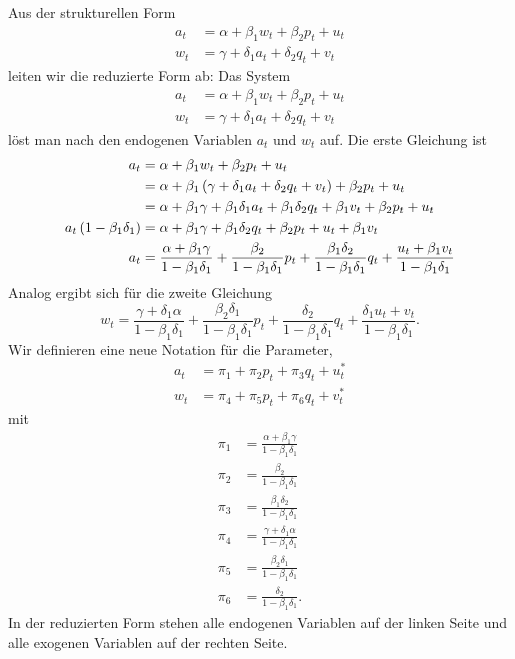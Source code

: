 \documentclass{article}
\begin{document}
Aus der strukturellen Form
\begin{align*}
a_{t} &=\alpha +\beta _{1}w_{t}+\beta _{2}p_{t}+u_{t} \\
w_{t} &=\gamma +\delta _{1}a_{t}+\delta _{2}q_{t}+v_{t}
\end{align*}
leiten wir die reduzierte Form ab: Das System
\begin{align*}
a_{t} &=\alpha +\beta _{1}w_{t}+\beta _{2}p_{t}+u_{t} \\
w_{t} &=\gamma +\delta _{1}a_{t}+\delta _{2}q_{t}+v_{t}
\end{align*}
löst man nach den endogenen Variablen $a_{t}$ und $w_{t}$ auf.
Die erste Gleichung ist
\begin{align*}
a_{t} &=\alpha +\beta _{1}w_{t}+\beta _{2}p_{t}+u_{t} \\
&=\alpha +\beta _{1}\left( \gamma +\delta _{1}a_{t}+\delta
_{2}q_{t}+v_{t}\right) +\beta _{2}p_{t}+u_{t} \\
&=\alpha +\beta _{1}\gamma +\beta _{1}\delta _{1}a_{t}+\beta _{1}\delta
_{2}q_{t}+\beta _{1}v_{t}+\beta _{2}p_{t}+u_{t} \\
a_{t}\left( 1-\beta _{1}\delta _{1}\right) &=\alpha +\beta _{1}\gamma
+\beta _{1}\delta _{2}q_{t}+\beta _{2}p_{t}+u_{t}+\beta _{1}v_{t} \\
a_{t} &=\frac{\alpha +\beta _{1}\gamma }{1-\beta _{1}\delta _{1}}+\frac{%
	\beta _{2}}{1-\beta _{1}\delta _{1}}p_{t}+\frac{\beta _{1}\delta _{2}}{%
	1-\beta _{1}\delta _{1}}q_{t}+\frac{u_{t}+\beta _{1}v_{t}}{1-\beta
	_{1}\delta _{1}}
\end{align*}
Analog ergibt sich für die zweite Gleichung
\[ w_{t}=\frac{\gamma +\delta _{1}\alpha }{1-\beta _{1}\delta _{1}}+\frac{\beta
	_{2}\delta _{1}}{1-\beta _{1}\delta _{1}}p_{t}+\frac{\delta _{2}}{1-\beta
	_{1}\delta _{1}}q_{t}+\frac{\delta _{1}u_{t}+v_{t}}{1-\beta _{1}\delta _{1}}.\]
Wir definieren eine neue Notation für die Parameter,
\begin{align*}
a_{t} &=\pi _{1}+\pi _{2}p_{t}+\pi _{3}q_{t}+u_{t}^{\ast } \\
w_{t} &=\pi _{4}+\pi _{5}p_{t}+\pi _{6}q_{t}+v_{t}^{\ast }
\end{align*}
mit
\begin{align*}
\pi _{1} &=\frac{\alpha +\beta _{1}\gamma }{1-\beta _{1}\delta _{1}} \\
\pi _{2} &=\frac{\beta _{2}}{1-\beta _{1}\delta _{1}} \\
\pi _{3} &=\frac{\beta _{1}\delta _{2}}{1-\beta _{1}\delta _{1}} \\
\pi _{4} &=\frac{\gamma +\delta _{1}\alpha }{1-\beta _{1}\delta _{1}} \\
\pi _{5} &=\frac{\beta _{2}\delta _{1}}{1-\beta _{1}\delta _{1}} \\
\pi _{6} &=\frac{\delta _{2}}{1-\beta _{1}\delta _{1}}.
\end{align*}
In der reduzierten Form stehen alle endogenen Variablen auf der linken
Seite und alle exogenen Variablen auf der rechten Seite.
\end{document}
